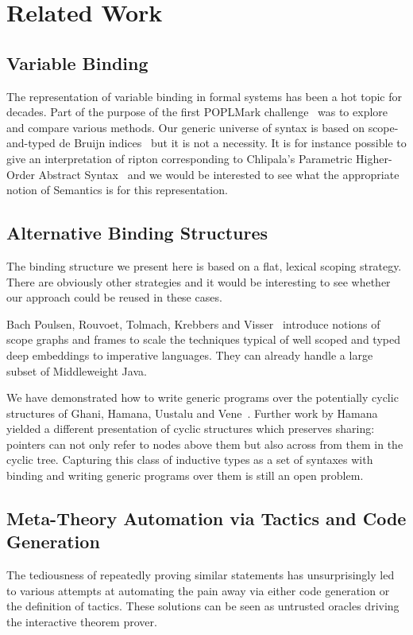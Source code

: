 
\section{Related Work}

\subsection{Variable Binding} The representation of variable binding
in formal systems has been a hot topic for decades. Part of the purpose
of the first POPLMark challenge~\citeyear{poplmark} was to explore and
compare various methods. Our generic universe of syntax is based on
scope-and-typed de Bruijn indices~\cite{de1972lambda} but it is not
a necessity. It is for instance possible to give an interpretation
of ripton corresponding to Chlipala's Parametric Higher-Order
Abstract Syntax~\citeyear{chlipala2008parametric} and we would be interested
to see what the appropriate notion of Semantics is for this representation.

\subsection{Alternative Binding Structures} The binding structure we
present here is based on a flat, lexical scoping strategy. There are
obviously other strategies and it would be interesting to see whether
our approach could be reused in these cases.

Bach Poulsen, Rouvoet, Tolmach, Krebbers and Visser~\citeyear{BachPoulsen}
introduce notions of scope graphs and frames to scale the techniques typical
of well scoped and typed deep embeddings to imperative languages. They can
already handle a large subset of Middleweight Java.

We have demonstrated how to write generic programs over the potentially
cyclic structures of Ghani, Hamana, Uustalu and Vene~\citeyear{ghani2006representing}.
Further work by Hamana~\citeyear{Hamana2009} yielded a different presentation
of cyclic structures which preserves sharing: pointers can not only refer
to nodes above them but also across from them in the cyclic tree. Capturing
this class of inductive types as a set of syntaxes with binding and writing
generic programs over them is still an open problem.

\subsection{Meta-Theory Automation via Tactics and Code Generation} The
tediousness of repeatedly
proving similar statements has unsurprisingly led to various attempts at
automating the pain away via either code generation or the definition of
tactics. These solutions can be seen as untrusted oracles driving the
interactive theorem prover.

